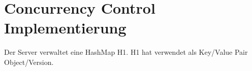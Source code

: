 
\section{Concurrency Control Implementierung }
\label{sec:conc-contr-impl}

Der Server verwaltet eine HashMap H1. H1 hat verwendet als Key/Value Pair Object/Version. 